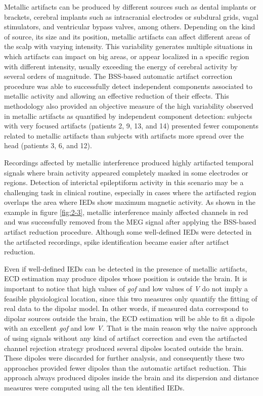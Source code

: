 Metallic artifacts can be produced by different sources such as dental implants or brackets, cerebral implants such as intracranial electrodes or subdural grids, vagal stimulators, and ventricular bypass valves, among others. Depending on the kind of source, its size and its position, metallic artifacts can affect different areas of the scalp with varying intensity. This variability generates multiple situations in which artifacts can impact on big areas, or appear localized in a specific region with different intensity, usually exceeding the energy of cerebral activity by several orders of magnitude. The BSS-based automatic artifact correction procedure was able to successfully detect independent components associated to metallic activity and allowing an effective reduction of their effects. This methodology also provided an objective measure of the high variability observed in metallic artifacts as quantified by independent component detection: subjects with very focused artifacts (patients 2, 9, 13, and 14) presented fewer components related to metallic artifacts than subjects with artifacts more spread over the head (patients 3, 6, and 12).

Recordings affected by metallic interference produced highly artifacted temporal signals where brain activity appeared completely masked in some electrodes or regions. Detection of interictal epileptiform activity in this scenario may be a challenging task in clinical routine, especially in cases where the artifacted region overlaps the area where IEDs show maximum magnetic activity. As shown in the example in figure \ref{fig:2-3}, metallic interference mainly affected channels in red and was successfully removed from the MEG signal after applying the BSS-based artifact reduction procedure. Although some well-defined IEDs were detected in the artifacted recordings, spike identification became easier after artifact reduction.

Even if well-defined IEDs can be detected in the presence of metallic artifacts, ECD estimation may produce dipoles whose position is outside the brain. It is important to notice that high values of \textit{gof} and low values of \textit{V} do not imply a feasible physiological location, since this two measures only quantify the fitting of real data to the dipolar model. In other words, if measured data correspond to dipolar sources outside the brain, the ECD estimation will be able to fit a dipole with an excellent \textit{gof} and low \textit{V}. That is the main reason why the naive approach of using signals without any kind of artifact correction and even the artifacted channel rejection strategy produced several dipoles located outside the brain. These dipoles were discarded for further analysis, and consequently these two approaches provided fewer dipoles than the automatic artifact reduction. This approach always produced dipoles inside the brain and its dispersion and distance measures were computed using all the ten identified IEDs.

